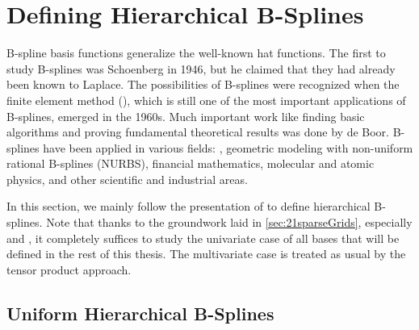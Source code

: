 \section{Defining Hierarchical B-Splines}
\label{sec:22bSplines}



B-spline basis functions generalize the well-known hat functions.
The first to study B-splines was Schoenberg in 1946,
but he claimed that they had already been known to Laplace.
%
The possibilities of B-splines were recognized when
the finite element method (\fem),
which is still one of the most important applications of B-splines,
emerged in the 1960s.
Much important work like finding basic algorithms and proving fundamental
theoretical results was done by de Boor.
B-splines have been applied in various fields:
\fem,
geometric modeling with non-uniform rational B-splines (NURBS),
financial mathematics,
molecular and atomic physics,
and other scientific and industrial areas.

In this section, we mainly follow the presentation of
\cite{Valentin14Hierarchische,Valentin16Hierarchical}
to define hierarchical B-splines.
Note that thanks to the groundwork laid in \cref{sec:21sparseGrids},
especially  and
,
it completely suffices to study the univariate case
of all bases that will be defined in the rest of this thesis.
The multivariate case is treated as usual by the tensor product approach.



\subsection{Uniform Hierarchical B-Splines}


